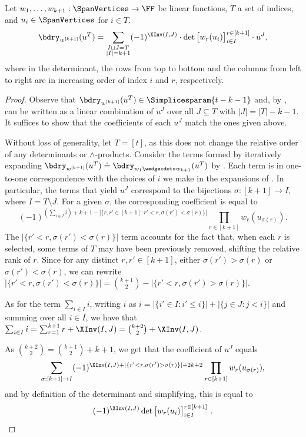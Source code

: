 \begin{proposition}
    \label{prop.composed-bdrys}
    Let $w_1,\dots, w_{k+1}:\SpanVertices\to\FF$ be linear functions, $T$ a set of indices, and $u_i \in \SpanVertices$ for $i \in T$.
    \begin{equation}\label{eq.prop.composed-bdrys}
    \bdry_{w^{[k+1]}}(u^T) = \sum_{\substack{I\sqcup J=T \\ |I|=k+1}} 
    (-1)^{\XInv(I,J)} \cdot 
    \det \begin{bmatrix}
        w_{r}(u_i)
    \end{bmatrix}_{i\in I}^{r\in [k+1]}
    \cdot u^J, 
    \end{equation}
    where in the determinant, the rows from top to bottom and the columns from left to right are in increasing order of index $i$ and $r$, respectively.
\end{proposition}
\begin{proof}
    Observe that $\bdry_{w^{[k+1]}}(u^T)\in \Simplicesparam{t-k-1}$ and, by , can be written as a linear combination of $u^J$ over all $J\subseteq T$ with $|J|=|T|-k-1$. It suffices to show that the coefficients of each $u^J$ match the ones given above.

    Without loss of generality, let $T = [t]$, as this does not change the relative order of any determinants or
    $\wedge$-products. Consider the terms formed by iteratively expanding $\bdry_{w^{[k+1]}}(u^T) \doteq \bdry_{w_{1}\wedgecdots w_{k+1}}(u^T)$ by . Each term is in one-to-one correspondence with the choices of $i$ we make in the expansions of . In particular, the terms that yield $u^J$ correspond to the bijections $\sigma:[k+1]\to I$, where $I=T \setminus J$. For a given $\sigma$, the corresponding coefficient is equal to
    \[ (-1)^{(\sum_{i\in I} i) + k+1 - |\{r,r'\in[k+1]: r'<r,\sigma(r')<\sigma(r) \}|} \prod_{r\in [k+1]}w_{r}(u_{\sigma(r)}). \]
    The $|\{r'<r,\sigma(r')<\sigma(r) \}|$ term accounts for the fact that, when each $r$ is selected, some terms of $T$ may have been previously removed, shifting the relative rank of $r$. Since for any distinct $r,r'\in [k+1]$, either $\sigma(r')>\sigma(r)$ or $\sigma(r')<\sigma(r)$, we can rewrite $|\{r'<r,\sigma(r')<\sigma(r) \}| = \binom{k+1}{2} - |\{r'<r,\sigma(r')>\sigma(r) \}|$.
    
    As for the term $\sum_{i\in I}i$, writing $i$ as $i = |\{i' \in I: i' \le i\}| + |\{j \in J: j < i\}|$ and summing over all $i \in I$, we have that
    $\sum_{i \in I} i = \sum_{r=1}^{k+1} r + \XInv(I,J) 
    = \binom{k+2}{2} + \XInv(I,J)$. 
    
    As $\binom{k+2}{2} = \binom{k+1}{2} + k+1$, we get that the coefficient of $u^J$ equals
    \[ \sum_{\sigma:[k+1]\to I} (-1)^{\XInv(I,J)+|\{r'<r,\sigma(r')>\sigma(r) \}| + 2k+2} \prod_{r\in [k+1]} w_{r}(u_{\sigma(r)}), \]
    and by definition of the determinant and simplifying, this is equal to
%
\[ (-1)^{\XInv(I,J)}\det \begin{bmatrix}
    w_{r}(u_i)
      \end{bmatrix}_{i\in I}^{r\in [k+1]}\,.    \qedhere
\]
\end{proof}

